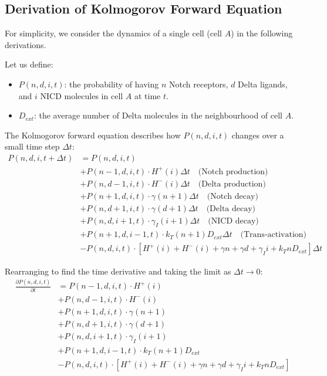 \documentclass{article}
\begin{document}
\begin{flushleft}
\subsection*{Derivation of Kolmogorov Forward Equation}
For simplicity, we consider the dynamics of a single cell (cell $A$) in the following derivations.

Let us define:
\begin{itemize}
    \item $P(n,d,i,t)$: the probability of having $n$ Notch receptors, $d$ Delta ligands, and $i$ NICD molecules in cell $A$ at time $t$.
    \item $D_{ext}$: the average number of Delta molecules in the neighbourhood of cell $A$.
\end{itemize}

The Kolmogorov forward equation describes how $P(n,d,i,t)$ changes over a small time step $\Delta t$:
\begin{align*}
P(n,d,i,t+\Delta t) &= P(n,d,i,t) \\
&+ P(n-1,d,i,t) \cdot H^+(i) \Delta t \quad \text{(Notch production)} \\
&+ P(n,d-1,i,t) \cdot H^-(i) \Delta t \quad \text{(Delta production)} \\
&+ P(n+1,d,i,t) \cdot \gamma(n+1)\Delta t \quad \text{(Notch decay)} \\
&+ P(n,d+1,i,t) \cdot \gamma(d+1)\Delta t \quad \text{(Delta decay)} \\
&+ P(n,d,i+1,t) \cdot \gamma_I(i+1)\Delta t \quad \text{(NICD decay)} \\
&+ P(n+1,d,i-1,t) \cdot k_T(n+1)D_{ext}\Delta t \quad \text{(Trans-activation)} \\
&- P(n,d,i,t) \cdot [H^+(i) + H^-(i) + \gamma n + \gamma d + \gamma_I i + k_T n D_{ext}]\Delta t
\end{align*}

Rearranging to find the time derivative and taking the limit as $\Delta t \rightarrow 0$:
\begin{align*}
\frac{\partial P(n,d,i,t)}{\partial t} &= P(n-1,d,i,t) \cdot H^+(i) \\
&+ P(n,d-1,i,t) \cdot H^-(i) \\
&+ P(n+1,d,i,t) \cdot \gamma(n+1) \\
&+ P(n,d+1,i,t) \cdot \gamma(d+1) \\
&+ P(n,d,i+1,t) \cdot \gamma_I(i+1) \\
&+ P(n+1,d,i-1,t) \cdot k_T(n+1)D_{ext} \\
&- P(n,d,i,t) \cdot [H^+(i) + H^-(i) + \gamma n + \gamma d + \gamma_I i + k_T n D_{ext}]
\end{align*}


\end{flushleft}
\end{document}
